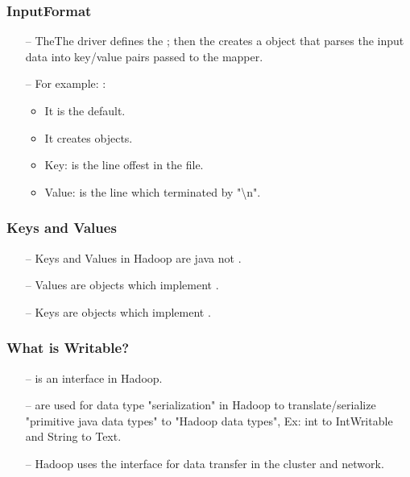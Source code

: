 \begin{frame}[c]{ }
	\frametitle{InputFormat}
	
	\begin{itemize}  [<+->]
		\item [--] TheThe driver defines the ; then the  creates a  object that parses the input data into key/value pairs passed to the mapper.
		\item [--] For example: :
		\begin{itemize}  [<+->]
			
			\item It is the default.
			\item It creates  objects.
			\item Key: is the line offest in the file.
			\item Value: is the line which terminated by "\textbackslash n".
		\end{itemize}		
		
		
	\end{itemize}		
	
\end{frame}
\begin{frame}[c]{ }
	\frametitle{Keys and Values}
	
	\begin{itemize}  [<+->]
		\item [--] Keys and Values in Hadoop are java  not .
		\item [--] Values are objects which implement .
		\item [--] Keys are objects which implement .

		
	\end{itemize}		
	
\end{frame}
\begin{frame}[c]{ }
	\frametitle{What is Writable?}
	
	\begin{itemize}  [<+->]
		\item [--]  is an interface in Hadoop.
		\item [--]  are used for data type "serialization" in Hadoop to translate/serialize "primitive java data types" to "Hadoop data types", Ex: int to IntWritable and String to Text.
		\item [--] Hadoop uses the  interface for data transfer in the cluster and network.
		
		
	\end{itemize}		
	
\end{frame}
